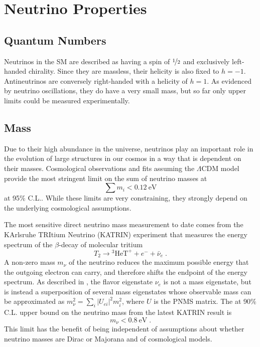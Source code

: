 \section{Neutrino Properties}

\subsection{Quantum Numbers}
Neutrinos in the SM are described as having a spin of $\nicefrac{1}{2}$ and exclusively left-handed chirality. Since they are massless, their helicity is also fixed to $h=-1$. Antineutrinos are conversely right-handed with a helicity of $h=1$. As evidenced by neutrino oscillations, they do have a very small mass, but so far only upper limits could be measured experimentally.

\subsection{Mass}
Due to their high abundance in the universe, neutrinos play an important role in the evolution of large structures in our cosmos in a way that is dependent on their masses. Cosmological observations and fits assuming the $\Lambda$CDM model provide the most stringent limit on the sum of neutrino masses at
\begin{equation}
    \sum m_i < \SI{0.12}{\eV}
\end{equation}
at 95\% C.L.\cite{Planck2018,PhysRevD.103.083533}. While these limits are very constraining, they strongly depend on the underlying cosmological assumptions.

The most sensitive direct neutrino mass measurement to date comes from the KArlsruhe TRItium Neutrino (KATRIN) experiment that measures the energy spectrum of the $\beta$-decay of molecular tritium
\begin{equation}
    T_2 \rightarrow \mathrm{^3HeT^+} + e^- + \bar{\nu}_e\;.
\end{equation}
A non-zero mass $m_\nu$ of the neutrino reduces the maximum possible energy that the outgoing electron can carry, and therefore shifts the endpoint of the energy spectrum. As described in , the flavor eigenstate $\nu_e$ is not a mass eigenstate, but is instead a superposition of several mass eigenstates whose observable mass can be approximated as $m^2_\nu = \sum_i |U_{ei}|^2m_i^2$, where $U$ is the PNMS matrix. The at 90\% C.L. upper bound on the neutrino mass from the latest KATRIN result is
\begin{equation}
    m_\nu < \SI{0.8}{\eV}\;.
\end{equation}
This limit has the benefit of being independent of assumptions about whether neutrino masses are Dirac or Majorana and of cosmological models.

